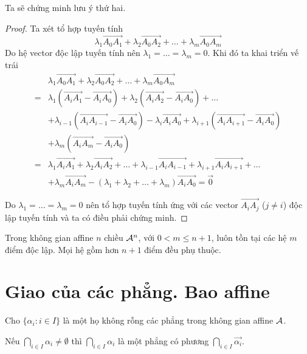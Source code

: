 Ta sẽ chứng minh lưu ý thứ hai.

\begin{proof}
	Ta xét tổ hợp tuyến tính \[\lambda_1 \overrightarrow{A_0 A_1} + \lambda_2 \overrightarrow{A_0 A_2} + \ldots + \lambda_m \overrightarrow{A_0 A_m}\]
	Do hệ vector độc lập tuyến tính nên $\lambda_1 = \ldots = \lambda_m = 0$. Khi đó ta khai triển vế trái
	\begin{align*}
		& \lambda_1 \overrightarrow{A_0 A_1} + \lambda_2 \overrightarrow{A_0 A_2} + \ldots + \lambda_m \overrightarrow{A_0 A_m} \\ = & \lambda_1 (\overrightarrow{A_i A_1} - \overrightarrow{A_i A_0}) + \lambda_2 (\overrightarrow{A_i A_2} - \overrightarrow{A_i A_0}) + \ldots \\ & + \lambda_{i-1} (\overrightarrow{A_i A_{i-1}} - \overrightarrow{A_i A_0}) - \lambda_i \overrightarrow{A_i A_0} + \lambda_{i+1} (\overrightarrow{A_i A_{i+1}} - \overrightarrow{A_i A_0}) \\ & + \lambda_m (\overrightarrow{A_i A_m} - \overrightarrow{A_i A_0}) \\ = & \lambda_1 \overrightarrow{A_i A_1} + \lambda_2 \overrightarrow{A_i A_2} + \ldots + \lambda_{i-1} \overrightarrow{A_i A_{i-1}} + \lambda_{i+1} \overrightarrow{A_i A_{i+1}} + \ldots \\ & + \lambda_m \overrightarrow{A_i A_m} - (\lambda_1 + \lambda_2 + \ldots + \lambda_m) \overrightarrow{A_i A_0} = \overrightarrow{0}
	\end{align*}
	
	Do $\lambda_1 = \ldots = \lambda_m = 0$ nên tổ hợp tuyến tính ứng với các vector $\overrightarrow{A_i A_j}$ ($j \neq i$) độc lập tuyến tính và ta có điều phải chứng minh.
\end{proof}

\begin{theorem}
	Trong không gian affine $n$ chiều $\mathcal{A}^n$, với $0 < m \leq n+1$, luôn tồn tại các hệ $m$ điểm độc lập. Mọi hệ gồm hơn $n+1$ điểm đều phụ thuộc.
\end{theorem}

\section{Giao của các phẳng. Bao affine}

Cho $\{\alpha_i: i \in I\}$ là một họ không rỗng các phẳng trong không gian affine $\mathcal{A}$.

\begin{theorem}
	Nếu $\displaystyle{\bigcap_{i \in I} \alpha_i \neq \emptyset}$ thì $\displaystyle{\bigcap_{i \in I} \alpha_i}$ là một phẳng có phương $\displaystyle{\bigcap_{i \in I}\overrightarrow{\alpha_i}}$.
	\label{theorem2}
\end{theorem}

